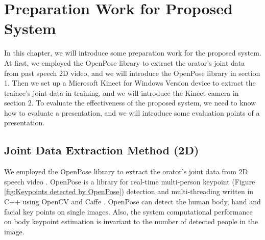 \chapter{Preparation Work for Proposed System}
\label{chapter:preparation}

\par In this chapter, we will introduce some preparation work for the proposed system. At first, we employed the OpenPose library \cite{cao2017realtime} to extract the orator's joint data from past speech 2D video, and we will introduce the OpenPose library in section 1. Then we set up a Microsoft Kinect for Windows Version device \cite{Shotton2011} to extract the trainee's joint data in training, and we will introduce the Kinect camera in section 2. To evaluate the effectiveness of the proposed system, we need to know how to evaluate a presentation, and we will introduce some evaluation points of a presentation.

\section{Joint Data Extraction Method (2D)}
We employed the OpenPose library to extract the orator's joint data from 2D speech video \cite{cao2017realtime}. OpenPose is a library for real-time multi-person keypoint (Figure \ref{fig:Keypoints detected by OpenPose}) detection and multi-threading written in C++ using OpenCV and Caffe \cite{Jia2014}. OpenPose can detect the human body, hand and facial key points on single images. Also, the system computational performance on body keypoint estimation is invariant to the number of detected people in the image.

